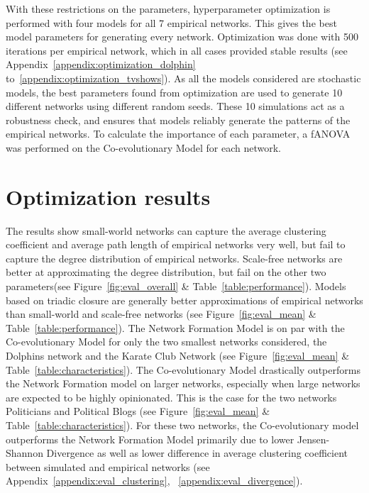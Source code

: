 \documentclass[11pt]{article}
\begin{document}
\noindent With these restrictions on the parameters, hyperparameter optimization is performed with four models for all 7 empirical networks. This gives the best model parameters for generating every network. Optimization was done with 500 iterations per empirical network, which in all cases provided stable results (see Appendix~\ref{appendix:optimization_dolphin} to~\ref{appendix:optimization_tvshows}). As all the models considered are stochastic models, the best parameters found from optimization are used to generate 10 different networks using different random seeds. These 10 simulations act as a robustness check, and ensures that models reliably generate the patterns of the empirical networks. To calculate the importance of each parameter, a fANOVA was performed on the Co-evolutionary Model for each network.

\section{Optimization results}

The results show small-world networks can capture the average clustering coefficient and average path length of empirical networks very well, but fail to capture the degree distribution of empirical networks. Scale-free networks are better at approximating the degree distribution, but fail on the other two parameters(see Figure~\ref{fig:eval_overall} \& Table~\ref{table:performance}). Models based on triadic closure are generally better approximations of empirical networks than small-world and scale-free networks (see Figure~\ref{fig:eval_mean} \& Table~\ref{table:performance}). The Network Formation Model is on par with the Co-evolutionary Model for only the two smallest networks considered, the Dolphins network and the Karate Club Network (see Figure~\ref{fig:eval_mean} \& Table~\ref{table:characteristics}). The Co-evolutionary Model drastically outperforms the Network Formation model on larger networks, especially when large networks are expected to be highly opinionated. This is the case for the two networks Politicians and Political Blogs (see Figure~\ref{fig:eval_mean} \& Table~\ref{table:characteristics}). For these two networks, the Co-evolutionary model outperforms the Network Formation Model primarily due to lower Jensen-Shannon Divergence as well as lower difference in average clustering coefficient between simulated and empirical networks (see Appendix~\ref{appendix:eval_clustering}, ~\ref{appendix:eval_divergence}).  
\end{document}
